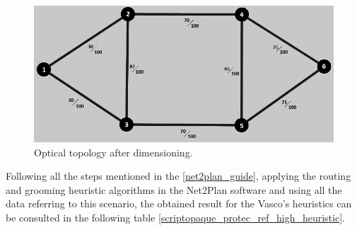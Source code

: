 \begin{figure}[H]
\centering
\includegraphics[width=13cm]{sdf/heuristic/opaque_protection/high/optical_topology_high}
\caption{Optical topology after dimensioning.}
\label{optical_topology_protec_ref_high_heuristic}
\end{figure}

Following all the steps mentioned in the \ref{net2plan_guide}, applying the routing and grooming heuristic algorithms in the Net2Plan software and using all the data referring to this scenario, the obtained result for the Vasco's heuristics can be consulted in the following table \ref{scriptopaque_protec_ref_high_heuristic}.

